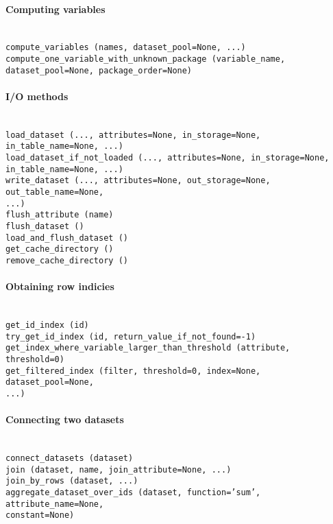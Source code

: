 \paragraph{Computing variables}~\\[1mm]
 {\tt compute_variables (names, dataset_pool=None, ...)}\\
 {\tt compute_one_variable_with_unknown_package (variable_name, }\\
 \hspace*{3cm} {\tt dataset_pool=None, package_order=None)}
 
\paragraph{I/O methods}~\\[1mm]
{\tt load\_dataset (..., attributes=None, in_storage=None, in_table_name=None, ...)} \\
{\tt load\_dataset_if_not_loaded (..., attributes=None, in_storage=None,} \\
\hspace*{3cm} {\tt in_table_name=None, ...)}\\
{\tt write\_dataset (..., attributes=None, out_storage=None, out_table_name=None, }\\
 \hspace*{3cm} {\tt ...)} \\
{\tt flush\_attribute (name)} \\
{\tt flush\_dataset ()}  \\
{\tt load_and_flush_dataset ()}  \\
{\tt get_cache_directory ()}  \\
{\tt remove_cache_directory ()}

\paragraph{Obtaining row indicies}~\\[1mm]
{\tt get_id_index (id)}  \\
{\tt try_get_id_index (id, return_value_if_not_found=-1)}  \\
{\tt get_index_where_variable_larger_than_threshold (attribute, threshold=0)}  \\
{\tt get_filtered_index (filter, threshold=0, index=None, dataset_pool=None, }\\
\hspace*{3cm} {\tt ...)}

\paragraph{Connecting two datasets}~\\[1mm]
{\tt connect_datasets (dataset)}  \\
{\tt join (dataset, name, join_attribute=None, ...)}  \\
{\tt join_by_rows (dataset, ...)}  \\
{\tt aggregate_dataset_over_ids (dataset, function='sum', attribute_name=None,}\\
\hspace*{3cm} {\tt constant=None)}

